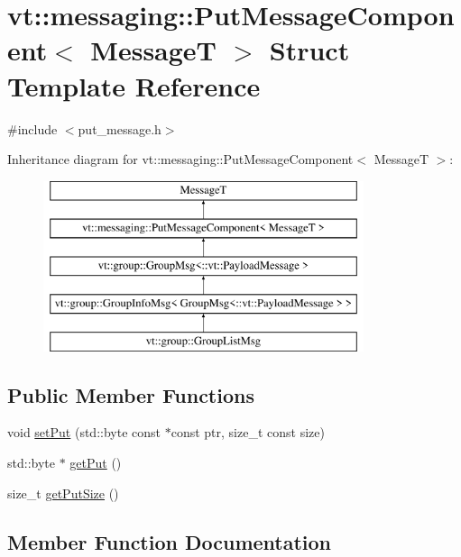 \hypertarget{structvt_1_1messaging_1_1_put_message_component}{}\section{vt\+:\+:messaging\+:\+:Put\+Message\+Component$<$ MessageT $>$ Struct Template Reference}
\label{structvt_1_1messaging_1_1_put_message_component}


{\ttfamily \#include $<$put\+\_\+message.\+h$>$}

Inheritance diagram for vt\+:\+:messaging\+:\+:Put\+Message\+Component$<$ MessageT $>$\+:\begin{figure}[H]
\begin{center}
\leavevmode
\includegraphics[height=5.000000cm]{structvt_1_1messaging_1_1_put_message_component}
\end{center}
\end{figure}
\subsection*{Public Member Functions}
\begin{DoxyCompactItemize}
\item 
void \hyperlink{structvt_1_1messaging_1_1_put_message_component_a138c867773a00a0c0d72def222a2a1c2}{set\+Put} (std\+::byte const $\ast$const ptr, size\+\_\+t const size)
\item 
std\+::byte $\ast$ \hyperlink{structvt_1_1messaging_1_1_put_message_component_a63bfc18668b13addbcb1d72b3f5837ab}{get\+Put} ()
\item 
size\+\_\+t \hyperlink{structvt_1_1messaging_1_1_put_message_component_ae5301d5d0a69192e2d5a3fe822f7406b}{get\+Put\+Size} ()
\end{DoxyCompactItemize}


\subsection{Member Function Documentation}
\mbox{\label{structvt_1_1messaging_1_1_put_message_component_a63bfc18668b13addbcb1d72b3f5837ab}} 
